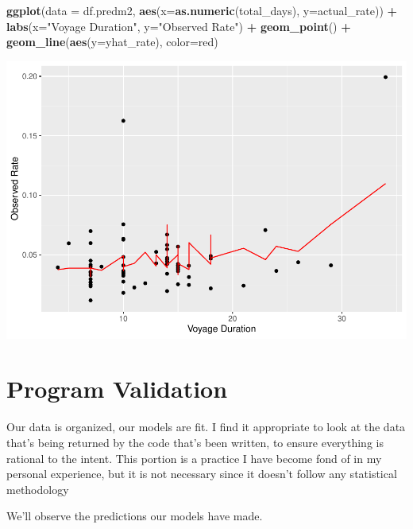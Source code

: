 \documentclass[
  11,
]{book}
\newenvironment{Shaded}{\begin{snugshade}}{\end{snugshade}}
\newcommand{\AttributeTok}[1]{\textcolor[rgb]{0.27,0.27,0.27}{#1}}
\newcommand{\FunctionTok}[1]{\textcolor[rgb]{0.27,0.27,0.27}{\textbf{#1}}}
\newcommand{\NormalTok}[1]{#1}
\newcommand{\SpecialCharTok}[1]{\textcolor[rgb]{0.43,0.43,0.43}{\textbf{#1}}}
\newcommand{\StringTok}[1]{\textcolor[rgb]{0.5,0.5,0.5}{#1}}
\begin{document}
\begin{Shaded}
\begin{Highlighting}[]
\FunctionTok{ggplot}\NormalTok{(}\AttributeTok{data =}\NormalTok{ df.predm2, }\FunctionTok{aes}\NormalTok{(}\AttributeTok{x=}\FunctionTok{as.numeric}\NormalTok{(total\_days), }\AttributeTok{y=}\NormalTok{actual\_rate)) }\SpecialCharTok{+}
  \FunctionTok{labs}\NormalTok{(}\AttributeTok{x=}\StringTok{"Voyage Duration"}\NormalTok{, }\AttributeTok{y=}\StringTok{"Observed Rate"}\NormalTok{) }\SpecialCharTok{+}
  \FunctionTok{geom\_point}\NormalTok{() }\SpecialCharTok{+}
  \FunctionTok{geom\_line}\NormalTok{(}\FunctionTok{aes}\NormalTok{(}\AttributeTok{y=}\NormalTok{yhat\_rate), }\AttributeTok{color=}\StringTok{\textquotesingle{}red\textquotesingle{}}\NormalTok{)}
\end{Highlighting}
\end{Shaded}

\includegraphics{_main_files/figure-latex/predm2_plot-1.pdf}

\hypertarget{program-validation}{%
\section*{Program Validation}\label{program-validation}}


Our data is organized, our models are fit. I find it appropriate to look at the data that's being returned by the code that's been written, to ensure everything is rational to the intent. This portion is a practice I have become fond of in my personal experience, but it is not necessary since it doesn't follow any statistical methodology

We'll observe the predictions our models have made.
\end{document}
